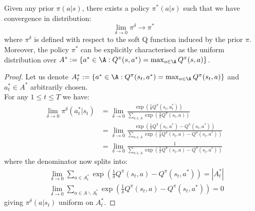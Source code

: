 \begin{proposition}
    Given any prior $\pi(a|s)$, there exists a policy $\pi^*(a|s)$ such that we have convergence in distribution:
    \[
        \lim_{\delta \to 0} \pi^\delta \to \pi^*
    \]
    where $\pi^\delta$ is defined with respect to the soft Q function induced by the prior $\pi$. Moreover, the policy $\pi^*$ can be explicitly characterised as the uniform distribution over $A^* := \{a^* \in \A: Q^\pi(s, a^*) = \max_{a \in \A} Q^\pi(s, a)\}$.
\end{proposition}
\begin{proof}
    Let us denote $A_t^* := \{a^* \in \A: Q^\pi(s_t, a^*) = \max_{a \in \A} Q^\pi(s_t, a)\}$ and $a_t^* \in A^*$ arbitrarily chosen. \\
    For any $1 \leq t \leq T$ we have:
    \begin{align*}
    \lim_{\delta \to 0} \pi^\delta(a_t^*|s_t) &= \lim_{\delta \to 0} \frac{\exp\left(\frac{1}{\delta} Q^\pi(s_t, a_t^*)\right)}{\sum_{a \in A} \exp \left(\frac{1}{\delta} Q^\pi(s_t, a)\right)} \\
    &= \lim_{\delta \to 0} \frac{\exp\left(\frac{1}{\delta} Q^\pi(s_t, a^*) - Q^\pi(s_t, a^*)\right)}{\sum_{a \in A} \exp \left(\frac{1}{\delta} Q^\pi(s_t, a) - Q^\pi(s_t, a^*)\right)} \\
    &= \lim_{\delta \to 0} \frac{1}{\sum_{a \in A} \exp \left(\frac{1}{\delta} Q^\pi(s_t, a) - Q^\pi(s_t, a^*)\right)}
    \end{align*}
    where the denominator now splits into:
    \begin{align*}
    &\lim_{\delta \to 0} \sum_{a \in A_t^*} \exp \left(\frac{1}{\delta} Q^\pi(s_t, a) - Q^\pi(s_t, a^*)\right) = |A^*_t|  \\
    &\lim_{\delta \to 0} \sum_{a \in A\backslash A_t^*} \exp \left(\frac{1}{\delta} Q^\pi(s_t, a) - Q^\pi(s_t, a^*)\right) = 0
    \end{align*}
    giving $\pi^\delta(a|s_t)$ uniform on $A_t^*$.
\end{proof}

